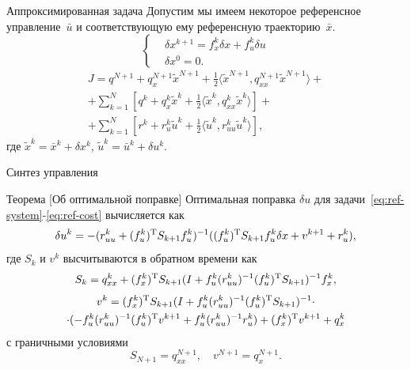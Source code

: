     \begin{frame}{Аппроксимированная задача}
        Допустим мы имеем некоторое референсное управление~$\bar u$ и соответствующую ему референсную траекторию~$\bar x$.
        \begin{equation}\label{eq:ref-system}
            \left\{\begin{aligned}
                &\delta x^{k+1} = f_x^k \delta x + f_u^k \delta u \\
                &\delta x^0 = 0.
            \end{aligned}\right.
        \end{equation}
        \begin{multline}\label{eq:ref-cost}
            J = q^{N+1} + q_x^{N+1}\tilde x^{N+1} + \frac{1}{2}\langle \tilde x^{N+1}, q_{xx}^{N+1}\tilde x^{N+1} \rangle
            + \\ +
            \sum_{k=1}^{N}\left[ q^{k} + q_x^{k}\tilde x^{k} + \frac{1}{2}\langle \tilde x^{k}, q_{xx}^{k}\tilde x^{k} \rangle \right]
            + \\ +
            \sum_{k=1}^{N}\left[ r^{k} + r_u^{k}\tilde u^{k} + \frac{1}{2}\langle \tilde u^{k}, r_{uu}^{k}\tilde u^{k} \rangle \right],
        \end{multline}
        где $\tilde x^k = \bar x^k + \delta x^k$, $\tilde u^k = \bar u^k + \delta u^k$.
    \end{frame}

    \begin{frame}{Синтез управления}
        \begin{block}{Теорема [Об оптимальной поправке]}
            Оптимальная поправка $\delta u$ для задачи~\eqref{eq:ref-system}-\eqref{eq:ref-cost} вычисляется как
            \begin{equation*}
                \delta u^k = - (r^k_{uu} + (f^k_u)^{\textnormal{T}} S_{k+1} f^k_u)^{-1} ((f^k_u)^{\textnormal{T}} S_{k+1} f^k_u \delta x + v^{k+1} + r^k_u),
            \end{equation*}
            где $S_k$ и $v^{k}$ высчитываются в обратном времени как
            \begin{equation*}
                    S_k = q^k_{xx} + (f^k_x)^{\textnormal{T}} S_{k+1} (I + f^k_u (r^k_{uu})^{-1} (f^k_u)^{\textnormal{T}} S_{k+1})^{-1} f_x^k,
            \end{equation*}
            \begin{multline*}
                v^k = (f^k_x)^{\textnormal{T}} S_{k+1} ( I + f^k_u (r^k_{uu})^{-1} (f^k_u)^{\textnormal{T}} S_{k+1})^{-1}
                \cdot \\ \cdot
                (-f^k_u (r^k_{uu})^{-1} (f^k_u)^{\textnormal{T}} v^{k+1} + f^k_u (r^k_{uu})^{-1} r^k_u) + (f^k_x)^{\textnormal{T}} v^{k+1} + q^k_x
            \end{multline*}
            с граничными условиями
            \begin{equation*}
                    S_{N+1} = q^{N+1}_{xx},
                    \quad
                    v^{N+1} = q^{N+1}_{x}.
            \end{equation*}
        \end{block}
    \end{frame}
    
